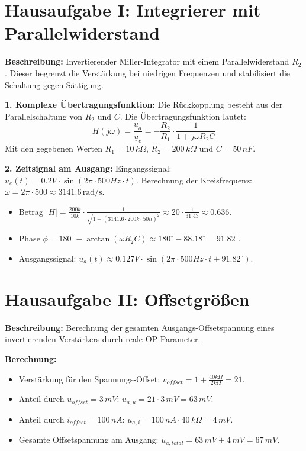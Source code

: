 \documentclass{article}
\begin{document}
\section*{Hausaufgabe I: Integrierer mit Parallelwiderstand}
\textbf{Beschreibung:} Invertierender Miller-Integrator mit einem Parallelwiderstand $R_2$. Dieser begrenzt die Verstärkung bei niedrigen Frequenzen und stabilisiert die Schaltung gegen Sättigung.

\textbf{1. Komplexe Übertragungsfunktion:}
Die Rückkopplung besteht aus der Parallelschaltung von $R_2$ und $C$. Die Übertragungsfunktion lautet:
\[ H(j\omega) = \frac{\underline{u}_{a}}{\underline{u}_{e}} = -\frac{R_2}{R_1} \cdot \frac{1}{1 + j\omega R_2 C} \]
Mit den gegebenen Werten $R_1 = 10\,k\Omega$, $R_2 = 200\,k\Omega$ und $C = 50\,nF$.

\textbf{2. Zeitsignal am Ausgang:}
Eingangssignal: $u_e(t) = 0.2V \cdot \sin(2\pi \cdot 500Hz \cdot t)$.
Berechnung der Kreisfrequenz: $\omega = 2\pi \cdot 500 \approx 3141.6\,\text{rad/s}$.
\begin{itemize}
    \item Betrag $|H| = \frac{200k}{10k} \cdot \frac{1}{\sqrt{1 + (3141.6 \cdot 200k \cdot 50n)^2}} \approx 20 \cdot \frac{1}{31.43} \approx 0.636$.
    \item Phase $\phi = 180^\circ - \arctan(\omega R_2 C) \approx 180^\circ - 88.18^\circ = 91.82^\circ$.
    \item Ausgangssignal: $u_a(t) \approx 0.127V \cdot \sin(2\pi \cdot 500Hz \cdot t + 91.82^\circ)$.
\end{itemize}

\section*{Hausaufgabe II: Offsetgrößen}
\textbf{Beschreibung:} Berechnung der gesamten Ausgangs-Offsetspannung eines invertierenden Verstärkers durch reale OP-Parameter.

\textbf{Berechnung:}
\begin{itemize}
    \item Verstärkung für den Spannungs-Offset: $v_{offset} = 1 + \frac{40k\Omega}{2k\Omega} = 21$.
    \item Anteil durch $u_{offset} = 3\,mV$: $u_{a,u} = 21 \cdot 3\,mV = 63\,mV$.
    \item Anteil durch $i_{offset} = 100\,nA$: $u_{a,i} = 100\,nA \cdot 40\,k\Omega = 4\,mV$.
    \item Gesamte Offsetspannung am Ausgang: $u_{a,total} = 63\,mV + 4\,mV = 67\,mV$.
\end{itemize}
\end{document}
